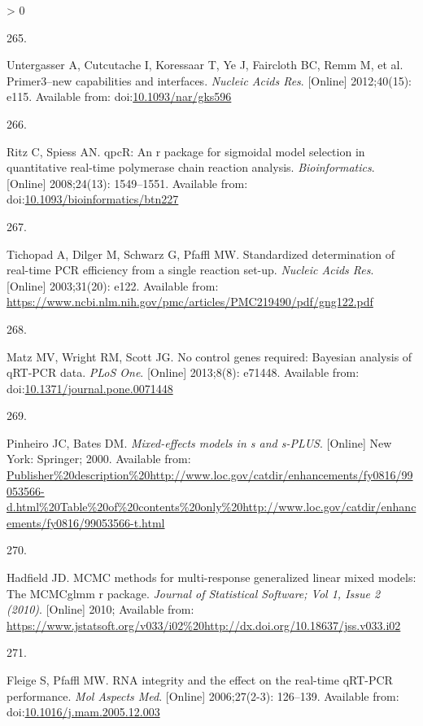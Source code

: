 \documentclass[twoside,10pt]{gihclass} %
\newlength{\cslhangindent}
\newlength{\csllabelwidth}
\newenvironment{CSLReferences}[3] %
 {%
  \setlength{\parindent}{0pt}
  \ifodd #1 \everypar{\setlength{\hangindent}{\cslhangindent}}\ignorespaces\fi
  \ifnum #2 > 0
  \setlength{\parskip}{#2\baselineskip}
  \fi
 }%
 {}
\newcommand{\CSLLeftMargin}[1]{\parbox[t]{\maxof{\widthof{#1}}{\csllabelwidth}}{#1}}
\newcommand{\CSLRightInline}[1]{\parbox[t]{\linewidth}{#1}}
\begin{document}
\begin{CSLReferences}{0}{0}
\leavevmode\hypertarget{ref-RN1816}{}%
\CSLLeftMargin{265. }
\CSLRightInline{Untergasser A, Cutcutache I, Koressaar T, Ye J, Faircloth BC, Remm M, et al. Primer3--new capabilities and interfaces. \emph{Nucleic Acids Res}. {[}Online{]} 2012;40(15): e115. Available from: doi:\href{https://doi.org/10.1093/nar/gks596}{10.1093/nar/gks596}}

\leavevmode\hypertarget{ref-RN1768}{}%
\CSLLeftMargin{266. }
\CSLRightInline{Ritz C, Spiess AN. qpcR: An r package for sigmoidal model selection in quantitative real-time polymerase chain reaction analysis. \emph{Bioinformatics}. {[}Online{]} 2008;24(13): 1549--1551. Available from: doi:\href{https://doi.org/10.1093/bioinformatics/btn227}{10.1093/bioinformatics/btn227}}

\leavevmode\hypertarget{ref-RN1934}{}%
\CSLLeftMargin{267. }
\CSLRightInline{Tichopad A, Dilger M, Schwarz G, Pfaffl MW. Standardized determination of real-time PCR efficiency from a single reaction set-up. \emph{Nucleic Acids Res}. {[}Online{]} 2003;31(20): e122. Available from: \url{https://www.ncbi.nlm.nih.gov/pmc/articles/PMC219490/pdf/gng122.pdf}}

\leavevmode\hypertarget{ref-RN1964}{}%
\CSLLeftMargin{268. }
\CSLRightInline{Matz MV, Wright RM, Scott JG. No control genes required: Bayesian analysis of qRT-PCR data. \emph{PLoS One}. {[}Online{]} 2013;8(8): e71448. Available from: doi:\href{https://doi.org/10.1371/journal.pone.0071448}{10.1371/journal.pone.0071448}}

\leavevmode\hypertarget{ref-RN1986}{}%
\CSLLeftMargin{269. }
\CSLRightInline{Pinheiro JC, Bates DM. \emph{Mixed-effects models in s and s-PLUS}. {[}Online{]} New York: Springer; 2000. Available from: \url{Publisher\%20description\%20http://www.loc.gov/catdir/enhancements/fy0816/99053566-d.html\%20Table\%20of\%20contents\%20only\%20http://www.loc.gov/catdir/enhancements/fy0816/99053566-t.html}}

\leavevmode\hypertarget{ref-RN1992}{}%
\CSLLeftMargin{270. }
\CSLRightInline{Hadfield JD. MCMC methods for multi-response generalized linear mixed models: The MCMCglmm r package. \emph{Journal of Statistical Software; Vol 1, Issue 2 (2010)}. {[}Online{]} 2010; Available from: \url{https://www.jstatsoft.org/v033/i02\%20http://dx.doi.org/10.18637/jss.v033.i02}}

\leavevmode\hypertarget{ref-RN2248}{}%
\CSLLeftMargin{271. }
\CSLRightInline{Fleige S, Pfaffl MW. RNA integrity and the effect on the real-time qRT-PCR performance. \emph{Mol Aspects Med}. {[}Online{]} 2006;27(2-3): 126--139. Available from: doi:\href{https://doi.org/10.1016/j.mam.2005.12.003}{10.1016/j.mam.2005.12.003}}


\end{CSLReferences}
\end{document}
